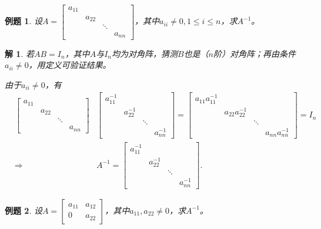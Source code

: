 \documentclass[a4paper]{book}
\newtheorem{eg}{例题}[chapter]
\newtheorem*{solution}{解}
\begin{document}
\begin{eg}
设$A = \begin{bmatrix} a_{11} & & & \\ & a_{22} & & \\ & & \ddots & \\ & & & a_{nn} \end{bmatrix}$，其中$a_{ii} \neq 0, 1 \leqslant i \leqslant n$，求$A^{-1}$。
\end{eg}

\begin{solution}
若$AB = I_n$，其中$A$与$I_n$均为对角阵，猜测$B$也是（$n$阶）对角阵；再由条件$a_{ii}\neq 0$，用定义可验证结果。

由于$a_{ii} \neq 0$，有
\begin{eqnarray*}
& \begin{bmatrix} a_{11} & & & \\ & a_{22} & & \\ & & \ddots & \\ & & & a_{nn} \end{bmatrix} & \begin{bmatrix} a_{11}^{-1} & & & \\ & a_{22}^{-1} & & \\ & & \ddots & \\ & & & a_{nn}^{-1} \end{bmatrix} = \begin{bmatrix} a_{11}a_{11}^{-1} & & & \\ & a_{22}a_{22}^{-1} & & \\ & & \ddots & \\ & & & a_{nn}a_{nn}^{-1} \end{bmatrix} = I_n \\
& \Longrightarrow & A^{-1} = \begin{bmatrix} a_{11}^{-1} & & & \\ & a_{22}^{-1} & & \\ & & \ddots & \\ & & & a_{nn}^{-1} \end{bmatrix}.
\end{eqnarray*}
\end{solution}

\begin{eg}
设$A = \begin{bmatrix} a_{11} & a_{12} \\ 0 & a_{22} \end{bmatrix}$，其中$a_{11}, a_{22} \neq 0$，求$A^{-1}$。
\end{eg}
\end{document}
